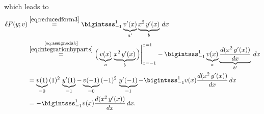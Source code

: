 \documentclass[12pt]{article}
\begin{document}
which leads to 
\begin{align}
	\delta F(y;v)
	 & \stackrel{\eqref{eq:reducedform3}}{=}
	\bigintsss_{-1}^{1}
	\underbrace{v^\prime(x)}_{a'}
	\underbrace{x^2\,y^\prime(x)}_{b}
	\,dx\notag                               \\
	 & 
	\stackrel{
		\stackrel{\mbox{\scriptsize$\eqref{eq:assignedab}$}}{\eqref{eq:integrationbyparts}}
	}{=}
	\Big(
	\underbrace{v(x)}_{a}
	\,
	\underbrace{x^2\,y'(x)}_{b}
	\Big)\Bigg|_{x=-1}^{x=1}
	-
	\bigintsss_{-1}^{1}
	\underbrace{v(x)}_{a}
	\underbrace{
		\frac{d(x^2\,y'(x))}{dx}
	}_{b'}\,dx\notag                         \\
	 & =
	\underbrace{v(1)}_{=0}\,
	(1)^2\,
	\underbrace{y'(1)}_{=1}
	- 
	\underbrace{v(-1)}_{=0}\,
	(-1)^2\,
	\underbrace{y'(-1)}_{=1}
	-\bigintsss_{-1}^{1}v(x)\frac{d(x^2\,y'(x))}{dx}\,dx
	\label{eq:somethingtonote}               \\
	 & =
	-\bigintsss_{-1}^{1}v(x)\frac{d(x^2\,y'(x))}{dx}\,dx.
\end{align}
\end{document}
